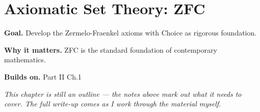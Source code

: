 \chapter{Axiomatic Set Theory: ZFC}
\label{ch:02-set-theory-02}

\begin{chapterintro}
\textbf{Goal.} Develop the Zermelo-Fraenkel axioms with Choice as rigorous foundation.

\textbf{Why it matters.} ZFC is the standard foundation of contemporary mathematics.

\textbf{Builds on.} Part II Ch.1
\end{chapterintro}

\textit{This chapter is still an outline --- the notes above mark out what it needs to cover. The full write-up comes as I work through the material myself.}
